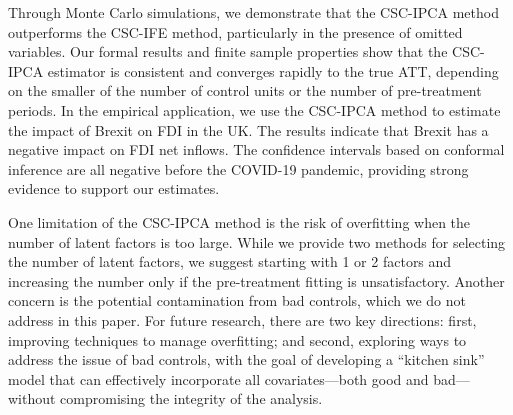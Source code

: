 \documentclass[12pt]{article}
\begin{document}
Through Monte Carlo simulations, we demonstrate that the CSC-IPCA method outperforms the CSC-IFE method, particularly in the presence of omitted variables. Our formal results and finite sample properties show that the CSC-IPCA estimator is consistent and converges rapidly to the true ATT, depending on the smaller of the number of control units or the number of pre-treatment periods. In the empirical application, we use the CSC-IPCA method to estimate the impact of Brexit on FDI in the UK. The results indicate that Brexit has a negative impact on FDI net inflows. The confidence intervals based on conformal inference are all negative before the COVID-19 pandemic, providing strong evidence to support our estimates.

One limitation of the CSC-IPCA method is the risk of overfitting when the number of latent factors is too large. While we provide two methods for selecting the number of latent factors, we suggest starting with 1 or 2 factors and increasing the number only if the pre-treatment fitting is unsatisfactory. Another concern is the potential contamination from bad controls, which we do not address in this paper. For future research, there are two key directions: first, improving techniques to manage overfitting; and second, exploring ways to address the issue of bad controls, with the goal of developing a ``kitchen sink'' model that can effectively incorporate all covariates—both good and bad—without compromising the integrity of the analysis.

\clearpage
\begingroup
{}


\endgroup

\clearpage
\appendix
{}
\renewcommand{\theequation}{\thesection.\arabic{equation}}
\setcounter{equation}{0}
\renewcommand{\theassumption}{\thesection.\arabic{assumption}}
\setcounter{assumption}{1}
\renewcommand{\thefigure}{\thesection.\arabic{figure}}
\setcounter{figure}{0}
\renewcommand{\thetable}{\thesection.\arabic{table}}
\setcounter{figure}{0}
\end{document}
